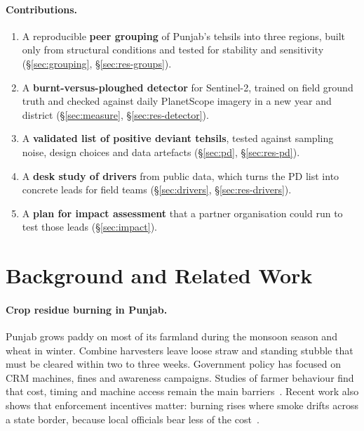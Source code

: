 \documentclass[sigconf,nonacm]{acmart}
\begin{document}
\paragraph{Contributions.}
\begin{enumerate}
  \item A reproducible \textbf{peer grouping} of Punjab's tehsils into three regions, built only from structural conditions and tested for stability and sensitivity (\S\ref{sec:grouping}, \S\ref{sec:res-groups}).
  \item A \textbf{burnt-versus-ploughed detector} for Sentinel-2, trained on field ground truth and checked against daily PlanetScope imagery in a new year and district (\S\ref{sec:measure}, \S\ref{sec:res-detector}).
  \item A \textbf{validated list of positive deviant tehsils}, tested against sampling noise, design choices and data artefacts (\S\ref{sec:pd}, \S\ref{sec:res-pd}).
  \item A \textbf{desk study of drivers} from public data, which turns the PD list into concrete leads for field teams (\S\ref{sec:drivers}, \S\ref{sec:res-drivers}).
  \item A \textbf{plan for impact assessment} that a partner organisation could run to test those leads (\S\ref{sec:impact}).
\end{enumerate}

\section{Background and Related Work}

\paragraph{Crop residue burning in Punjab.} Punjab grows paddy on most of its farmland during the monsoon season and wheat in winter. Combine harvesters leave loose straw and standing stubble that must be cleared within two to three weeks. Government policy has focused on CRM machines, fines and awareness campaigns. Studies of farmer behaviour find that cost, timing and machine access remain the main barriers~\cite{kurinji2024averse,rgics2024crm}. Recent work also shows that enforcement incentives matter: burning rises where smoke drifts across a state border, because local officials bear less of the cost~\cite{dipoppa2024bureaucrat}.
\end{document}
